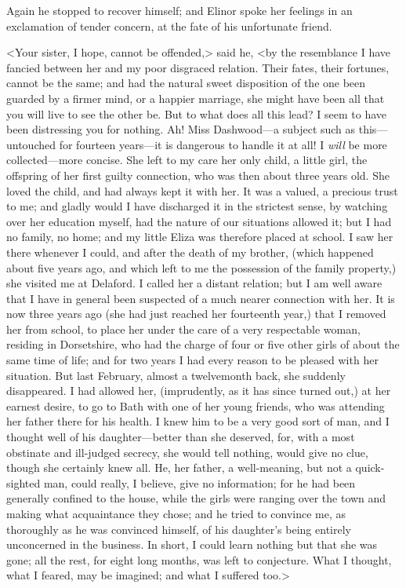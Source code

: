 Again he stopped to recover himself; and Elinor spoke her feelings in an exclamation of tender concern, at the fate of his unfortunate friend.

<Your sister, I hope, cannot be offended,> said he, <by the resemblance I have fancied between her and my poor disgraced relation. Their fates, their fortunes, cannot be the same; and had the natural sweet disposition of the one been guarded by a firmer mind, or a happier marriage, she might have been all that you will live to see the other be. But to what does all this lead? I seem to have been distressing you for nothing. Ah! Miss Dashwood—a subject such as this—untouched for fourteen years—it is dangerous to handle it at all! I \textit{will} be more collected—more concise. She left to my care her only child, a little girl, the offspring of her first guilty connection, who was then about three years old. She loved the child, and had always kept it with her. It was a valued, a precious trust to me; and gladly would I have discharged it in the strictest sense, by watching over her education myself, had the nature of our situations allowed it; but I had no family, no home; and my little Eliza was therefore placed at school. I saw her there whenever I could, and after the death of my brother, (which happened about five years ago, and which left to me the possession of the family property,) she visited me at Delaford. I called her a distant relation; but I am well aware that I have in general been suspected of a much nearer connection with her. It is now three years ago (she had just reached her fourteenth year,) that I removed her from school, to place her under the care of a very respectable woman, residing in Dorsetshire, who had the charge of four or five other girls of about the same time of life; and for two years I had every reason to be pleased with her situation. But last February, almost a twelvemonth back, she suddenly disappeared. I had allowed her, (imprudently, as it has since turned out,) at her earnest desire, to go to Bath with one of her young friends, who was attending her father there for his health. I knew him to be a very good sort of man, and I thought well of his daughter—better than she deserved, for, with a most obstinate and ill-judged secrecy, she would tell nothing, would give no clue, though she certainly knew all. He, her father, a well-meaning, but not a quick-sighted man, could really, I believe, give no information; for he had been generally confined to the house, while the girls were ranging over the town and making what acquaintance they chose; and he tried to convince me, as thoroughly as he was convinced himself, of his daughter's being entirely unconcerned in the business. In short, I could learn nothing but that she was gone; all the rest, for eight long months, was left to conjecture. What I thought, what I feared, may be imagined; and what I suffered too.>

